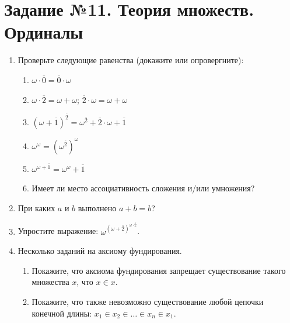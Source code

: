 \documentclass[10pt,a4paper,oneside]{article}
\begin{document}
\section*{Задание №11. Теория множеств. Ординалы}
\begin{enumerate}
\item Проверьте следующие равенства (докажите или опровергните):
\begin{enumerate}
\item $\omega\cdot\overline{0} = \overline{0}\cdot\omega$
\item $\omega\cdot\overline{2} = \omega + \omega$; $\overline{2}\cdot\omega = \omega + \omega$
\item $(\omega+\overline{1})^{\overline{2}} = \omega^{\overline{2}} + \overline{2}\cdot \omega + \overline{1}$
\item $\omega ^ \omega = (\omega ^ {\overline{2}}) ^ \omega$
\item $\omega ^ {\omega + \overline{1}} = \omega ^ \omega + \overline{1}$
\item Имеет ли место ассоциативность сложения и/или умножения?
\end{enumerate}
\item При каких $a$ и $b$ выполнено $a + b = b$?
\item Упростите выражение: $\omega^{{(\omega + \overline{2})}^{\omega\cdot\overline{2}}}$.

\item Несколько заданий на аксиому фундирования.
\begin{enumerate}
\item Покажите, что аксиома фундирования запрещает существование такого множества $x$, что $x \in x$.
\item Покажите, что также невозможно существование любой цепочки конечной длины: $x_1 \in x_2 \in \dots \in x_n \in x_1$.
\end{enumerate}


\end{enumerate}
\end{document}
